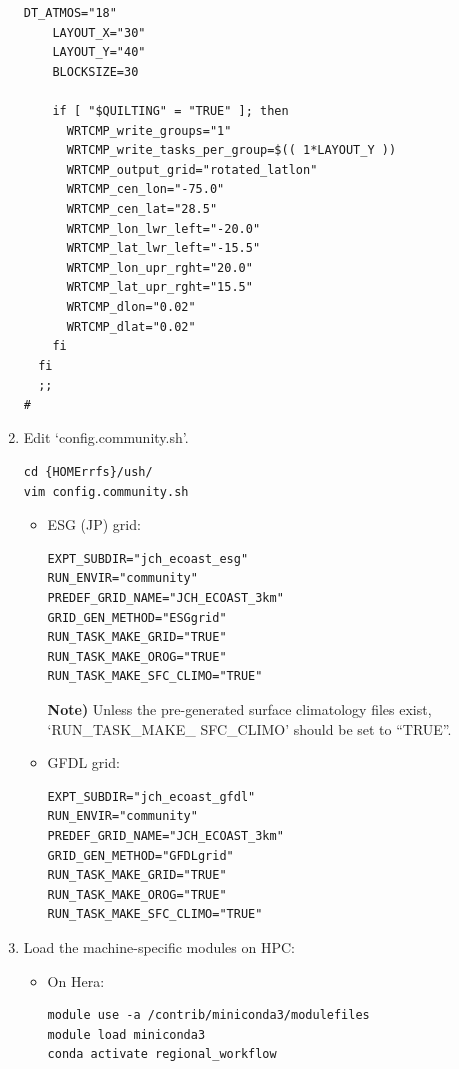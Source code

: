 \documentclass[11pt,fleqn]{report}              %
\begin{document}
\begin{enumerate}
\begin{lstlisting}[frame=trBL, basicstyle=\tiny]
    DT_ATMOS="18"
    LAYOUT_X="30"
    LAYOUT_Y="40"
    BLOCKSIZE=30

    if [ "$QUILTING" = "TRUE" ]; then
      WRTCMP_write_groups="1"
      WRTCMP_write_tasks_per_group=$(( 1*LAYOUT_Y ))
      WRTCMP_output_grid="rotated_latlon"
      WRTCMP_cen_lon="-75.0"
      WRTCMP_cen_lat="28.5"
      WRTCMP_lon_lwr_left="-20.0"
      WRTCMP_lat_lwr_left="-15.5"
      WRTCMP_lon_upr_rght="20.0"
      WRTCMP_lat_upr_rght="15.5"
      WRTCMP_dlon="0.02"
      WRTCMP_dlat="0.02"
    fi    
  fi
  ;;
#

\end{lstlisting}

\item Edit `config.community.sh'.

\lstset{language=bash}   
\begin{lstlisting}[frame=trBL]
cd {HOMErrfs}/ush/
vim config.community.sh
\end{lstlisting}


\begin{itemize}
\item ESG (JP) grid:

\lstset{language=bash}   
\begin{lstlisting}[frame=trBL, basicstyle=\small]
EXPT_SUBDIR="jch_ecoast_esg"
RUN_ENVIR="community"
PREDEF_GRID_NAME="JCH_ECOAST_3km"
GRID_GEN_METHOD="ESGgrid"
RUN_TASK_MAKE_GRID="TRUE"
RUN_TASK_MAKE_OROG="TRUE"
RUN_TASK_MAKE_SFC_CLIMO="TRUE"
\end{lstlisting}

{\bf Note)} Unless the pre-generated surface climatology files exist, `RUN\_TASK\_MAKE\_ SFC\_CLIMO' should be set to ``TRUE''.

\item GFDL grid:

\lstset{language=bash}   
\begin{lstlisting}[frame=trBL, basicstyle=\small]
EXPT_SUBDIR="jch_ecoast_gfdl"
RUN_ENVIR="community"
PREDEF_GRID_NAME="JCH_ECOAST_3km"
GRID_GEN_METHOD="GFDLgrid"
RUN_TASK_MAKE_GRID="TRUE"
RUN_TASK_MAKE_OROG="TRUE"
RUN_TASK_MAKE_SFC_CLIMO="TRUE"
\end{lstlisting}


\end{itemize}

\item Load the machine-specific modules on HPC:

\begin{itemize}
\item On Hera:
\lstset{language=bash}   
\begin{lstlisting}[frame=trBL]
module use -a /contrib/miniconda3/modulefiles
module load miniconda3
conda activate regional_workflow
\end{lstlisting}
\end{itemize}


\end{enumerate}
\end{document}
